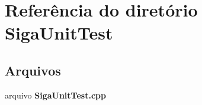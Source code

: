 \section{Referência do diretório Siga\+Unit\+Test}
\label{dir_23e11f1194bcd02fd32850b709e79802}
\subsection*{Arquivos}
\begin{DoxyCompactItemize}
\item 
arquivo {\bf Siga\+Unit\+Test.\+cpp}
\end{DoxyCompactItemize}
